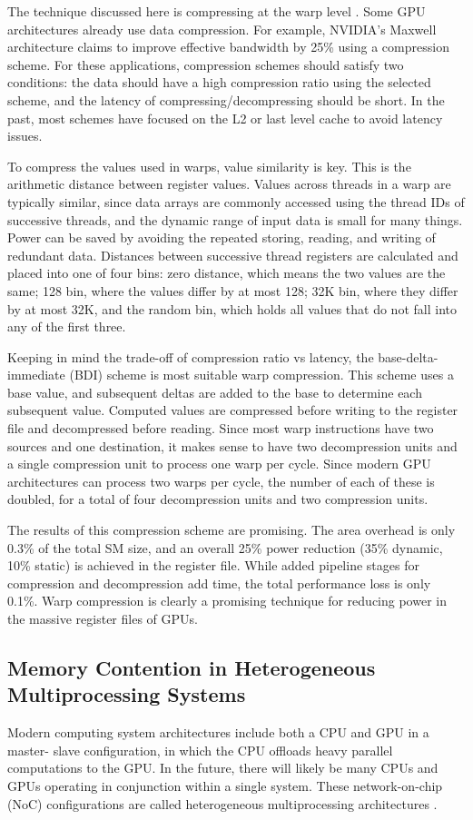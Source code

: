 \documentclass[prodmode,acmtecs]{acmsmall} %
\begin{document}
The technique discussed here is compressing at the warp level
\cite{WarpCompression}. Some GPU architectures already use data compression. For
example, NVIDIA's Maxwell architecture claims to improve effective bandwidth by
25\% using a compression scheme. For these applications, compression schemes
should satisfy two conditions: the data should have a high compression ratio
using the selected scheme, and the latency of compressing/decompressing should
be short. In the past, most schemes have focused on the L2 or last level cache
to avoid latency issues.

To compress the values used in warps, value similarity is key. This is the
arithmetic distance between register values. Values across threads in a warp are
typically similar, since data arrays are commonly accessed using the thread IDs
of successive threads, and the dynamic range of input data is small for many
things. Power can be saved by avoiding the repeated storing, reading, and
writing of redundant data. Distances between successive thread registers are
calculated and placed into one of four bins: zero distance, which means the two
values are the same; 128 bin, where the values differ by at most 128; 32K bin,
where they differ by at most 32K, and the random bin, which holds all values
that do not fall into any of the first three.

Keeping in mind the trade-off of compression ratio vs latency, the base-delta-
immediate (BDI) scheme is most suitable warp compression. This scheme uses a
base value, and subsequent deltas are added to the base to determine each
subsequent value. Computed values are compressed before writing to the register
file and decompressed before reading. Since most warp instructions have two
sources and one destination, it makes sense to have two decompression units and
a single compression unit to process one warp per cycle. Since modern GPU
architectures can process two warps per cycle, the number of each of these is
doubled, for a total of four decompression units and two compression units.

The results of this compression scheme are promising. The area overhead is only
0.3\% of the total SM size, and an overall 25\% power reduction (35\% dynamic,
10\% static) is achieved in the register file. While added pipeline stages for
compression and decompression add time, the total performance loss is only
0.1\%. Warp compression is clearly a promising technique for reducing power in
the massive register files of GPUs.

\subsection{Memory Contention in Heterogeneous Multiprocessing Systems}
Modern computing system architectures include both a CPU and GPU in a master-
slave configuration, in which the CPU offloads heavy parallel computations to
the GPU. In the future, there will likely be many CPUs and GPUs operating in
conjunction within a single system. These network-on-chip (NoC) configurations
are called heterogeneous multiprocessing architectures
\cite{ManagingConcurrencyInHeterogeneous}.
\end{document}
